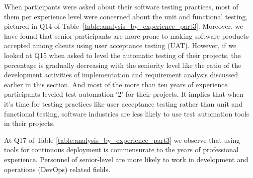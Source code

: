 When participants were asked about their software testing practices, most of them per experience level were concerned about the unit and functional testing, pictured in Q14 of Table~\ref{table:analysis_by_experience_part3}. Moreover, we have found that senior participants are more prone to making software products accepted among clients using user acceptance testing (UAT). However, if we looked at Q15 when asked to level the automatic testing of their projects, the percentage is gradually decreasing with the seniority level like the ratio of the development activities of implementation and requirement analysis discussed earlier in this section. And most of the more than ten years of experience participants leveled test automation `2' for their projects. It implies that when it's time for testing practices like user acceptance testing rather than unit and functional testing, software industries are less likely to use test automation tools in their projects.

At Q17 of Table \ref{table:analysis_by_experience_part3} we observe that using tools for continuous deployment is commensurate to the years of professional experience. Personnel of senior-level are more likely to work in development and operations (DevOps) related fields.